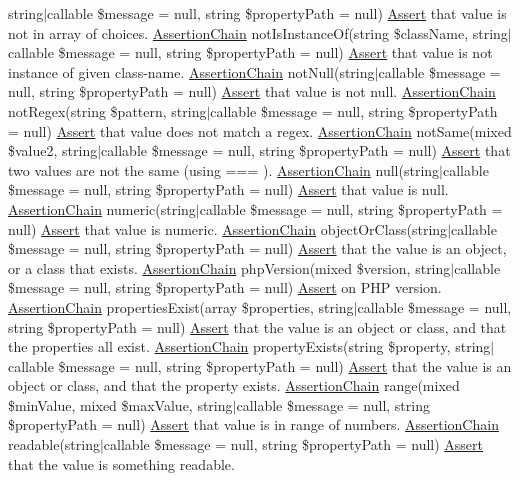 string$\vert$callable \$message = null, string \$property\+Path = null) \mbox{\hyperlink{class_assert_1_1_assert}{Assert}} that value is not in array of choices.  \mbox{\hyperlink{class_assert_1_1_assertion_chain}{Assertion\+Chain}} not\+Is\+Instance\+Of(string \$class\+Name, string$\vert$callable \$message = null, string \$property\+Path = null) \mbox{\hyperlink{class_assert_1_1_assert}{Assert}} that value is not instance of given class-\/name.  \mbox{\hyperlink{class_assert_1_1_assertion_chain}{Assertion\+Chain}} not\+Null(string$\vert$callable \$message = null, string \$property\+Path = null) \mbox{\hyperlink{class_assert_1_1_assert}{Assert}} that value is not null.  \mbox{\hyperlink{class_assert_1_1_assertion_chain}{Assertion\+Chain}} not\+Regex(string \$pattern, string$\vert$callable \$message = null, string \$property\+Path = null) \mbox{\hyperlink{class_assert_1_1_assert}{Assert}} that value does not match a regex.  \mbox{\hyperlink{class_assert_1_1_assertion_chain}{Assertion\+Chain}} not\+Same(mixed \$value2, string$\vert$callable \$message = null, string \$property\+Path = null) \mbox{\hyperlink{class_assert_1_1_assert}{Assert}} that two values are not the same (using === ).  \mbox{\hyperlink{class_assert_1_1_assertion_chain}{Assertion\+Chain}} null(string$\vert$callable \$message = null, string \$property\+Path = null) \mbox{\hyperlink{class_assert_1_1_assert}{Assert}} that value is null.  \mbox{\hyperlink{class_assert_1_1_assertion_chain}{Assertion\+Chain}} numeric(string$\vert$callable \$message = null, string \$property\+Path = null) \mbox{\hyperlink{class_assert_1_1_assert}{Assert}} that value is numeric.  \mbox{\hyperlink{class_assert_1_1_assertion_chain}{Assertion\+Chain}} object\+Or\+Class(string$\vert$callable \$message = null, string \$property\+Path = null) \mbox{\hyperlink{class_assert_1_1_assert}{Assert}} that the value is an object, or a class that exists.  \mbox{\hyperlink{class_assert_1_1_assertion_chain}{Assertion\+Chain}} php\+Version(mixed \$version, string$\vert$callable \$message = null, string \$property\+Path = null) \mbox{\hyperlink{class_assert_1_1_assert}{Assert}} on P\+HP version.  \mbox{\hyperlink{class_assert_1_1_assertion_chain}{Assertion\+Chain}} properties\+Exist(array \$properties, string$\vert$callable \$message = null, string \$property\+Path = null) \mbox{\hyperlink{class_assert_1_1_assert}{Assert}} that the value is an object or class, and that the properties all exist.  \mbox{\hyperlink{class_assert_1_1_assertion_chain}{Assertion\+Chain}} property\+Exists(string \$property, string$\vert$callable \$message = null, string \$property\+Path = null) \mbox{\hyperlink{class_assert_1_1_assert}{Assert}} that the value is an object or class, and that the property exists.  \mbox{\hyperlink{class_assert_1_1_assertion_chain}{Assertion\+Chain}} range(mixed \$min\+Value, mixed \$max\+Value, string$\vert$callable \$message = null, string \$property\+Path = null) \mbox{\hyperlink{class_assert_1_1_assert}{Assert}} that value is in range of numbers.  \mbox{\hyperlink{class_assert_1_1_assertion_chain}{Assertion\+Chain}} readable(string$\vert$callable \$message = null, string \$property\+Path = null) \mbox{\hyperlink{class_assert_1_1_assert}{Assert}} that the value is something readable.  